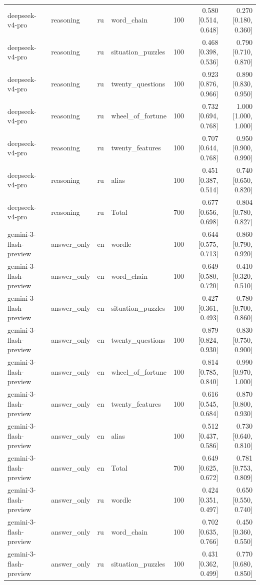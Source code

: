 \begin{longtable}{llllrrr}
deepseek-v4-pro & reasoning & ru & word\_chain & 100 & 0.580 [0.514, 0.648] & 0.270 [0.180, 0.360] \\
deepseek-v4-pro & reasoning & ru & situation\_puzzles & 100 & 0.468 [0.398, 0.536] & 0.790 [0.710, 0.870] \\
deepseek-v4-pro & reasoning & ru & twenty\_questions & 100 & 0.923 [0.876, 0.966] & 0.890 [0.830, 0.950] \\
deepseek-v4-pro & reasoning & ru & wheel\_of\_fortune & 100 & 0.732 [0.694, 0.768] & 1.000 [1.000, 1.000] \\
deepseek-v4-pro & reasoning & ru & twenty\_features & 100 & 0.707 [0.644, 0.768] & 0.950 [0.900, 0.990] \\
deepseek-v4-pro & reasoning & ru & alias & 100 & 0.451 [0.387, 0.514] & 0.740 [0.650, 0.820] \\
deepseek-v4-pro & reasoning & ru & Total & 700 & 0.677 [0.656, 0.698] & 0.804 [0.780, 0.827] \\
gemini-3-flash-preview & answer\_only & en & wordle & 100 & 0.644 [0.575, 0.713] & 0.860 [0.790, 0.920] \\
gemini-3-flash-preview & answer\_only & en & word\_chain & 100 & 0.649 [0.580, 0.720] & 0.410 [0.320, 0.510] \\
gemini-3-flash-preview & answer\_only & en & situation\_puzzles & 100 & 0.427 [0.361, 0.493] & 0.780 [0.700, 0.860] \\
gemini-3-flash-preview & answer\_only & en & twenty\_questions & 100 & 0.879 [0.824, 0.930] & 0.830 [0.750, 0.900] \\
gemini-3-flash-preview & answer\_only & en & wheel\_of\_fortune & 100 & 0.814 [0.785, 0.840] & 0.990 [0.970, 1.000] \\
gemini-3-flash-preview & answer\_only & en & twenty\_features & 100 & 0.616 [0.545, 0.684] & 0.870 [0.800, 0.930] \\
gemini-3-flash-preview & answer\_only & en & alias & 100 & 0.512 [0.437, 0.586] & 0.730 [0.640, 0.810] \\
gemini-3-flash-preview & answer\_only & en & Total & 700 & 0.649 [0.625, 0.672] & 0.781 [0.753, 0.809] \\
gemini-3-flash-preview & answer\_only & ru & wordle & 100 & 0.424 [0.351, 0.497] & 0.650 [0.550, 0.740] \\
gemini-3-flash-preview & answer\_only & ru & word\_chain & 100 & 0.702 [0.635, 0.766] & 0.450 [0.360, 0.550] \\
gemini-3-flash-preview & answer\_only & ru & situation\_puzzles & 100 & 0.431 [0.362, 0.499] & 0.770 [0.680, 0.850] \\

\end{longtable}
